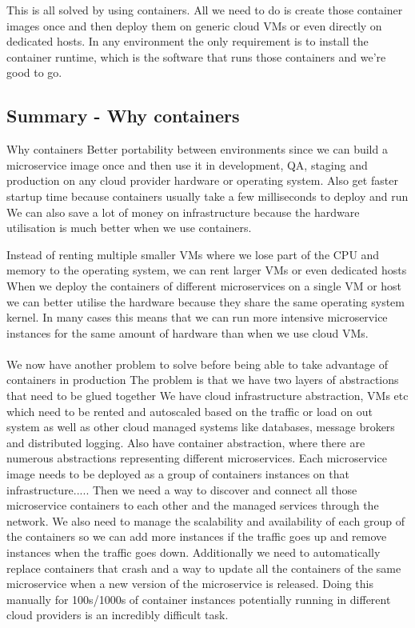 \documentclass[a4paper, 11pt]{book}
\begin{document}
    This is all solved by using containers.
    All we need to do is create those container images once and then deploy them on generic cloud VMs or even directly on dedicated hosts.
    In any environment the only requirement is to install the container runtime, which is the software that runs those containers and we're good to go.

    \subsection{Summary - Why containers}
    Why containers
    Better portability between environments since we can build a microservice image once and then use it in development, QA, staging and production on any cloud provider hardware or operating system.
    Also get faster startup time because containers usually take a few milliseconds to deploy and run
    We can also save a lot of money on infrastructure because the hardware utilisation is much better when we use containers.

    Instead of renting multiple smaller VMs where we lose part of the CPU and memory to the operating system, we can rent larger VMs or even dedicated hosts
    When we deploy the containers of different microservices on a single VM or host we can better utilise the hardware because they share the same operating system kernel.
    In many cases this means that we can run more intensive microservice instances for the same amount of hardware than when we use cloud VMs.

    \paragraph{}
    We now have another problem to solve before being able to take advantage of containers in production
    The problem is that we have two layers of abstractions that need to be glued together
    We have cloud infrastructure abstraction, VMs etc which need to be rented and autoscaled based on the traffic or load on out system as well as other cloud managed systems like databases, message brokers and distributed logging.
    Also have container abstraction, where there are numerous abstractions representing different microservices.
    Each microservice image needs to be deployed as a group of containers instances on that infrastructure.....
    Then we need a way to discover and connect all those microservice containers to each other and the managed services through the network.
    We also need to manage the scalability and availability of each group of the containers so we can add more instances if the traffic goes up and remove instances when the traffic goes down.
    Additionally we need to automatically replace containers that crash and a way to update all the containers of the same microservice when a new version of the microservice is released.
    Doing this manually for 100s/1000s of container instances potentially running in different cloud providers is an incredibly difficult task.
\end{document}
